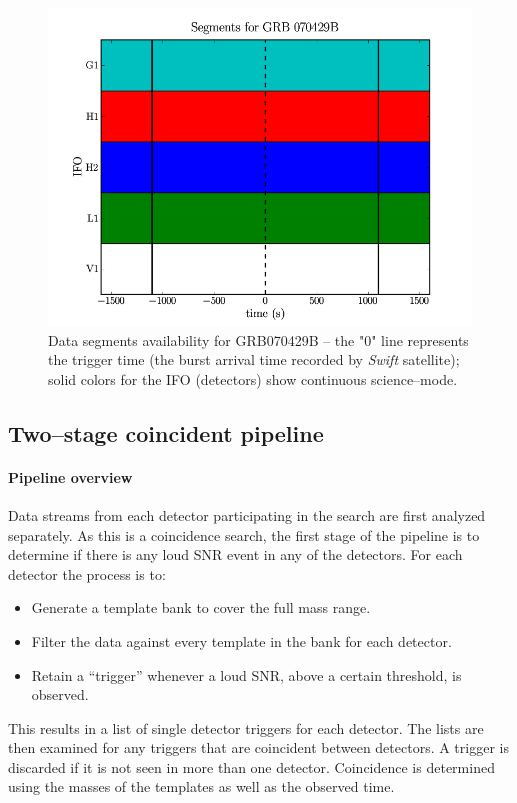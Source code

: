 \begin{figure}[ht]
\centering
\includegraphics[scale=0.30]{Images/GRB070429B_segments.png}
\caption{Data segments availability for GRB070429B -- the "0" line represents the trigger time (the burst arrival time recorded by \emph{Swift} satellite); solid colors for the IFO (detectors) show continuous science--mode.}
\label{grbsegments}
\end{figure}

\subsection{Two--stage coincident pipeline}
\label{pipeline}
\paragraph{Pipeline overview}

Data streams from each detector participating in the search are first analyzed separately. As this is a coincidence search, the first stage of the pipeline is to determine if there is any loud \ac{SNR} event in any of the detectors. For each detector the process is to:
%
\begin{itemize}
 \item Generate a template bank to cover the full mass range.
 \item Filter the data against every template in the bank for each detector.
 \item Retain a ``trigger'' whenever a loud \ac{SNR}, above a certain threshold, is observed.
\end{itemize}
%
This results in a list of single detector triggers for each detector. The lists are then examined for any triggers that are coincident between detectors. A trigger is discarded if it is not seen in more than one detector. Coincidence is determined using the masses of the templates as well as the observed time.

